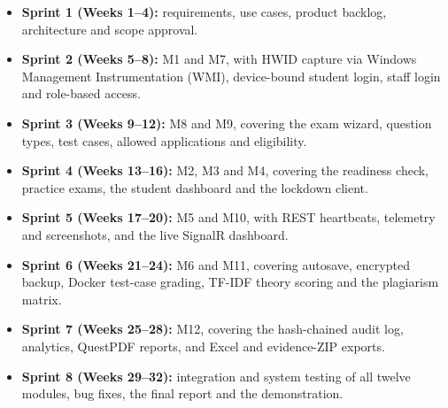 \begin{itemize}[noitemsep]
\item \textbf{Sprint 1 (Weeks 1--4):} requirements, use cases, product backlog, architecture and scope approval.
\item \textbf{Sprint 2 (Weeks 5--8):} M1 and M7, with HWID capture via Windows Management Instrumentation (WMI), device-bound student login, staff login and role-based access.
\item \textbf{Sprint 3 (Weeks 9--12):} M8 and M9, covering the exam wizard, question types, test cases, allowed applications and eligibility.
\item \textbf{Sprint 4 (Weeks 13--16):} M2, M3 and M4, covering the readiness check, practice exams, the student dashboard and the lockdown client.
\item \textbf{Sprint 5 (Weeks 17--20):} M5 and M10, with REST heartbeats, telemetry and screenshots, and the live SignalR dashboard.
\item \textbf{Sprint 6 (Weeks 21--24):} M6 and M11, covering autosave, encrypted backup, Docker test-case grading, TF-IDF theory scoring and the plagiarism matrix.
\item \textbf{Sprint 7 (Weeks 25--28):} M12, covering the hash-chained audit log, analytics, QuestPDF reports, and Excel and evidence-ZIP exports.
\item \textbf{Sprint 8 (Weeks 29--32):} integration and system testing of all twelve modules, bug fixes, the final report and the demonstration.
\end{itemize}

